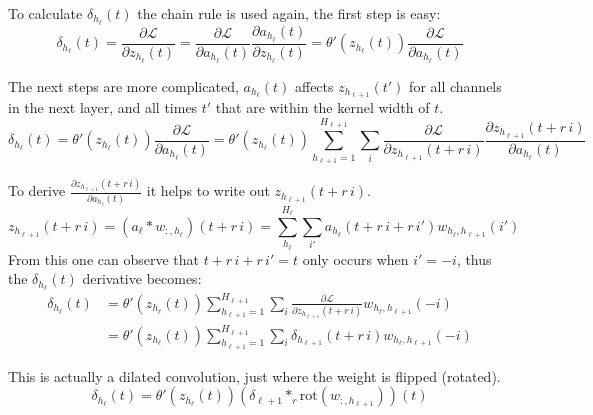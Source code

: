 To calculate $\delta_{h_\ell}(t)$ the chain rule is used again, the first step is easy:
\begin{equation}
\delta_{h_\ell}(t) = \frac{\partial \mathcal{L}}{\partial z_{h_\ell}(t)} = \frac{\partial \mathcal{L}}{\partial a_{h_\ell}(t)} \frac{\partial a_{h_\ell}(t)}{\partial z_{h_\ell}(t)} = \theta'(z_{h_\ell}(t)) \frac{\partial \mathcal{L}}{\partial a_{h_\ell}(t)}
\end{equation}

The next steps are more complicated, $a_{h_\ell}(t)$ affects $z_{h_{\ell+1}}(t')$ for all channels in the next layer, and all times $t'$ that are within the kernel width of $t$.
\begin{equation*}
\delta_{h_\ell}(t) = \theta'(z_{h_\ell}(t)) \frac{\partial \mathcal{L}}{\partial a_{h_\ell}(t)} = \theta'(z_{h_\ell}(t)) \sum_{h_{\ell+1}=1}^{H_{\ell+1}} \sum_{i} \frac{\partial \mathcal{L}}{\partial z_{h_{\ell+1}}(t + r\, i)} \frac{\partial z_{h_{\ell+1}}(t + r\, i)}{\partial a_{h_\ell}(t)}
\end{equation*}

To derive $\frac{\partial z_{h_{\ell+1}}(t + r\, i)}{\partial a_{h_\ell}(t)}$ it helps to write out $z_{h_{\ell+1}}(t + r\, i)$.
\begin{equation}
z_{h_{\ell+1}}(t + r\, i) = (a_{\ell} * w_{:,h_\ell})(t + r\, i) = \sum_{h_\ell}^{H_\ell} \sum_{i'} a_{h_\ell}(t + r\, i + r\, i') w_{h_\ell, h_{\ell+1}}(i')
\end{equation}
From this one can observe that $t + r\, i + r\, i' = t$ only occurs when $i' = -i$, thus the $\delta_{h_\ell}(t)$ derivative becomes:
\begin{equation}
\begin{aligned}
\delta_{h_\ell}(t) &= \theta'(z_{h_\ell}(t)) \sum_{h_{\ell+1}=1}^{H_{\ell+1}} \sum_{i} \frac{\partial \mathcal{L}}{\partial z_{h_{\ell+1}}(t + r\, i)} w_{h_\ell, h_{\ell+1}}(-i) \\
&= \theta'(z_{h_\ell}(t)) \sum_{h_{\ell+1}=1}^{H_{\ell+1}} \sum_{i} \delta_{h_{\ell+1}}(t + r\, i) w_{h_\ell, h_{\ell+1}}(-i)
\end{aligned}
\end{equation}

This is actually a dilated convolution, just where the weight is flipped (rotated).
\begin{equation}
\delta_{h_\ell}(t) = \theta'(z_{h_\ell}(t)) (\delta_{\ell + 1} *_r \mathrm{rot}(w_{:, h_{\ell + 1}}))(t)
\end{equation}

